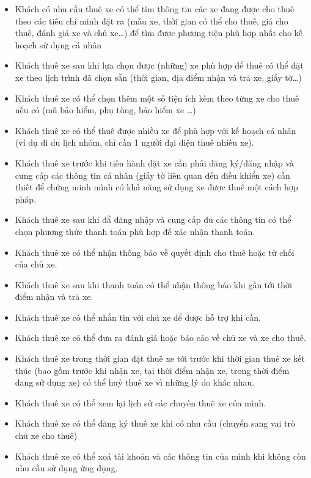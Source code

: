 \documentclass[../main.tex]{subfiles}
\begin{document}
	\begin{itemize}
		\item Khách có nhu cầu thuê xe có thể tìm thông tin các xe đang được cho thuê theo các tiêu chí minh đặt ra (mẫu xe,
		thời gian có thể cho thuê, giá cho thuê, đánh giá xe và chủ xe\ldots) để tìm được phương tiện phù hợp nhất cho kế
		hoạch sử dụng cá nhân
		\item Khách thuê xe sau khi lựa chọn được (những) xe phù hợp để thuê có thể đặt xe theo lịch trình đã chọn sẵn (thời
		gian, địa điểm nhận và trả xe, giấy tờ\ldots)
		\item Khách thuê xe có thể chọn thêm một số tiện ích kèm theo từng xe cho thuê nếu có (mũ bảo hiểm, phụ tùng, bảo
		hiểm xe \ldots)
		\item Khách thuê xe có thể thuê được nhiều xe để phù hợp với kế hoạch cá nhân (ví dụ đi du lịch nhóm, chỉ cần 1
		người đại diện thuê nhiều xe).
		\item Khách thuê xe trước khi tiến hành đặt xe cần phải đăng ký/đăng nhập và cung cấp các thông tin cá nhân (giấy tờ
		liên quan đến điều khiển xe) cần thiết để chứng minh mình có khả năng sử dụng xe được thuê một cách hợp pháp.
		\item Khách thuê xe sau khi đẵ đăng nhập và cung cấp đủ các thông tin có thể chọn phương thức thanh toán phù hợp để
		xác nhận thanh toán.
		\item Khách thuê xe có thể nhận thông báo về quyết định cho thuê hoặc từ chối của chủ xe.
		\item Khách thuê xe sau khi thanh toán có thể nhận thông báo khi gần tới thời điểm nhận và trả xe.
		\item Khách thuê xe có thể nhắn tin với chủ xe để được hỗ trợ khi cần.
		\item Khách thuê xe có thể đưa ra đánh giá hoặc báo cáo về chủ xe và xe cho thuê.
		\item Khách thuê xe trong thời gian đặt thuê xe tới trước khi thời gian thuê xe kết thúc (bao gồm trước khi nhận xe,
		tại thời điểm nhận xe, trong thời điểm đang sử dụng xe) có thể huỷ thuê xe vì những lý do khác nhau.
		\item Khách thuê xe có thể xem lại lịch sử các chuyến thuê xe của mình.
		\item Khách thuê xe có thể đăng ký thuê xe khi có nhu cầu (chuyển sang vai trò chủ xe cho thuê)
		\item Khách thuê xe có thể xoá tài khoản và các thông tin của mình khi không còn nhu cầu sử dụng ứng dụng.
	\end{itemize}
\end{document}

